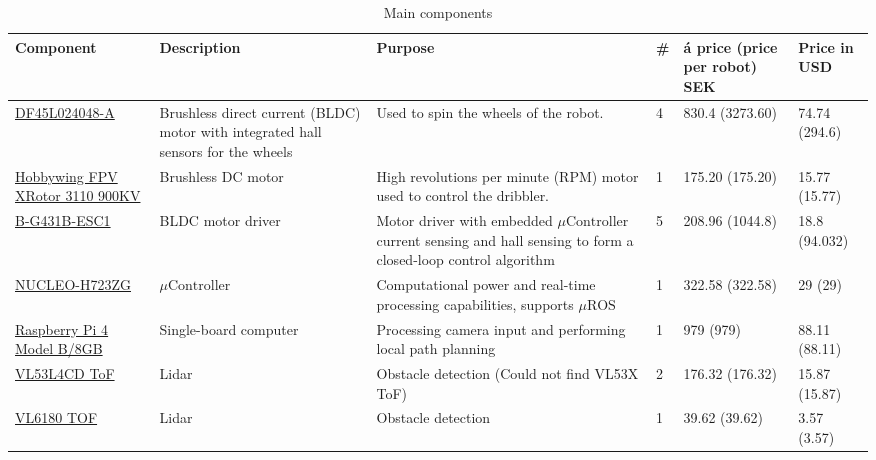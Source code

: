 \documentclass[a4paper,8pt]{article}
\begin{document}
  \begin{center}
    \begin{longtable}{|p{3cm}|p{3cm}|p{3cm}|p{1cm}|p{3cm}|p{3cm}|}
      \caption{Main components}
      \\ \hline \rowcolor{gray!50} \textbf{Component} & \textbf{Description} & \textbf{Purpose} & \textbf{\#} & \textbf{á price (price per robot) SEK} & \textbf{Price in USD}\\ \endhead \hline


      \href{https://www.nanotec.com/fileadmin/files/Datenblaetter/BLDC/DF45/DF45L024048-A.pdf?1656012533}{DF45L024048-A} & Brushless direct current (BLDC) motor with integrated hall sensors for the wheels & Used to spin the wheels of the robot. & 4 & 830.4 (3273.60) & 74.74 (294.6)\\ \hline 
      \href{https://www.hobbywing.com/en/products/xrotor3110}{Hobbywing FPV XRotor 3110 900KV} & Brushless DC motor & High revolutions per minute (RPM) motor used to control the dribbler. & 1 & 175.20 (175.20) & 15.77 (15.77) \\ \hline 
      \href{https://www.mouser.se/datasheet/2/389/b-g431b-esc1-1848063.pdf}{B-G431B-ESC1} & BLDC motor driver & Motor driver with embedded $\mu\text{Controller}$ current sensing and hall sensing to form a closed-loop control algorithm & 5 & 208.96 (1044.8) &  18.8 (94.032)\\ \hline 
      \href{https://www.st.com/en/evaluation-tools/nucleo-h723zg.html}{NUCLEO-H723ZG} & $\mu\text{Controller}$ & Computational power and real-time processing capabilities, supports $\mu\text{ROS}$ & 1 & 322.58 (322.58) & 29 (29) \\ \hline 
      \href{https://datasheets.raspberrypi.com/rpi4/raspberry-pi-4-datasheet.pdf}{Raspberry Pi 4 Model B/8GB} & Single-board computer & Processing camera input and performing local path planning & 1 & 979 (979) & 88.11 (88.11) \\ \hline
      \href{https://learn.adafruit.com/adafruit-vl53l4cd-time-of-flight-distance-sensor?view=all}{VL53L4CD ToF} & Lidar & Obstacle detection (Could not find VL53X ToF) & 2 & 176.32 (176.32) & 15.87 (15.87) \\ \hline
      \href{https://www.electrokit.com/upload/product/41013/41013634/DM00112632.pdf}{VL6180 TOF} & Lidar & Obstacle detection & 1 & 39.62 (39.62) & 3.57 (3.57)\\ \hline

\end{longtable}
\end{center}
\end{document}
